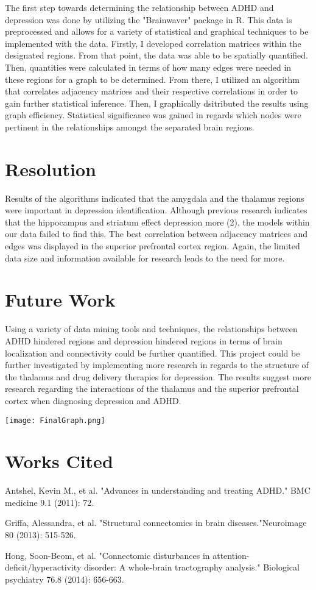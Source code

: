 \documentclass{article}
\begin{document}
The first step towards determining the relationship between ADHD and depression was done by utilizing the "Brainwaver" package in R. This data is preprocessed and allows for a variety of statistical and graphical techniques to be implemented with the data. Firstly, I developed correlation matrices within the designated regions. From that point, the data was able to be spatially quantified. Then, quantities were calculated in terms of how many edges were needed in these regions for a graph to be determined. From there, I utilized an algorithm that correlates adjacency matrices and their respective correlations in order to gain further statistical inference. Then, I graphically dsitributed the results using graph efficiency. Statistical significance was gained in regards which nodes were pertinent in the relationships amongst the separated brain regions. 


\section{Resolution}

Results of the algorithms indicated that the amygdala and the thalamus regions were important in depression identification. Although previous research indicates that the hippocampus and striatum effect depression more (2), the models within our data failed to find this. The best correlation between adjacency matrices and edges was displayed in the superior prefrontal cortex region. Again, the limited data size and information available for research leads to the need for more. 

\section{Future Work}

Using a variety of data mining tools and techniques, the relationships between ADHD hindered regions and depression hindered regions in terms of brain localization and connectivity could be further quantified. This project could be further investigated by implementing more research in regards to the structure of the thalamus and drug delivery therapies for depression. The results suggest more research regarding the interactions of the thalamus and the superior prefrontal cortex when diagnosing depression and ADHD. 


\texttt{[image: FinalGraph.png]}


\section{Works Cited}
Antshel, Kevin M., et al. "Advances in understanding and treating ADHD." BMC medicine 9.1 (2011): 72.

Griffa, Alessandra, et al. "Structural connectomics in brain diseases."Neuroimage 80 (2013): 515-526.

Hong, Soon-Beom, et al. "Connectomic disturbances in attention-deficit/hyperactivity disorder: A whole-brain tractography analysis." Biological psychiatry 76.8 (2014): 656-663.
\end{document}
